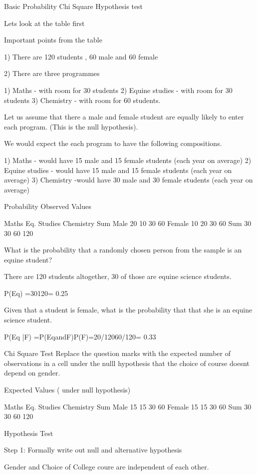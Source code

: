     Basic Probability
    Chi Square Hypothesis test
 
Lets look at the table first
 
Important points from the table
 
1) There are 120 students , 60 male and 60 female
 
2) There are three programmes
 
	1) Maths - with room for 30 students
	2) Equine studies - with room for 30 students
	3) Chemistry - with room for 60 students.

Let us assume that there a male and female student are equally likely to enter each program. (This is the null hypothesis).

We would expect the each program to have the following compositions.

	1) Maths - would have 15 male and 15 female students (each year on average)
	2) Equine studies - would have 15 male and 15 female students (each year on average)
	3) Chemistry -would have 30 male and 30 female students (each year on average)
 

Probability
Observed Values


Maths
Eq. Studies
Chemistry
Sum
Male
20
10
30
60
Female
10
20
30
60
Sum
30
30
60
120

What is the probability that a randomly chosen person from the sample is an equine student?
 
There are 120 students altogether, 30 of those are equine science students.

P(Eq) =30120= 0.25

Given that a student is female, what is the probability that that she is an equine science student.

P(Eq |F) =P(EqandF)P(F)=20/12060/120= 0.33
 
 
Chi Square Test 
Replace the question marks with the expected number of observations
in a cell under the nulll hypothesis that the choice of course doesnt depend on gender.

Expected Values ( under null hypothesis)


Maths
Eq. Studies
Chemistry
Sum
Male
15
15
30
60
Female
15
15
30
60
Sum
30
30
60
120


 
Hypothesis Test
 
Step 1:  Formally write out null and alternative hypothesis
 
 
    Gender and Choice of College coure are independent of each other.
 
